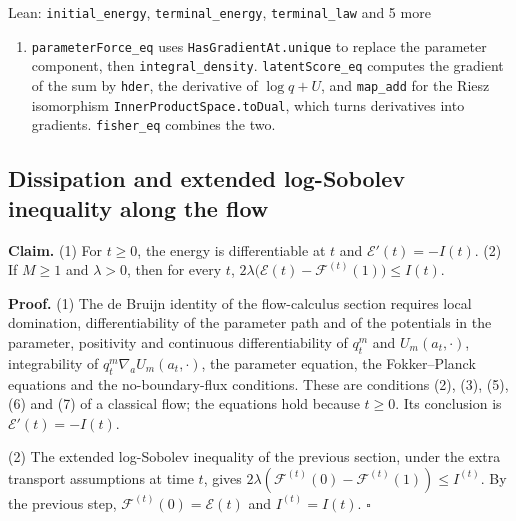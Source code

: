 \documentclass[11pt,a4paper]{report}
\begin{document}
\begin{leanbox}{Lean: \texttt{initial\_\allowbreak{}energy}, \texttt{terminal\_\allowbreak{}energy}, \texttt{terminal\_\allowbreak{}law} and 5 more}
\begin{enumerate}
\item \texttt{parameter\allowbreak{}Force\_\allowbreak{}eq} uses \texttt{Has\allowbreak{}Gradient\allowbreak{}At.\allowbreak{}unique} to replace the parameter component, then \texttt{integral\_\allowbreak{}density}. \texttt{latent\allowbreak{}Score\_\allowbreak{}eq} computes the gradient of the sum by \texttt{hder}, the derivative of \(\log q+U\), and \texttt{map\_\allowbreak{}add} for the Riesz isomorphism \texttt{Inner\allowbreak{}Product\allowbreak{}Space.\allowbreak{}to\allowbreak{}Dual}, which turns derivatives into gradients. \texttt{fisher\_\allowbreak{}eq} combines the two.

\end{enumerate}
\end{leanbox}
\subsection{\texorpdfstring{Dissipation and extended log-Sobolev inequality along the flow}{Dissipation and extended log-Sobolev inequality along the flow}}


\textbf{Claim.} (1) For \(t\ge0\), the energy is differentiable at \(t\) and \(\mathcal E'(t)=-I(t)\). (2) If \(M\ge1\) and \(\lambda>0\), then for every \(t\), \(2\lambda\bigl(\mathcal E(t)-\mathcal F^{(t)}(1)\bigr)\le I(t)\).




\textbf{Proof.} (1) The de Bruijn identity of the flow-calculus section requires local domination, differentiability of the parameter path and of the potentials in the parameter, positivity and continuous differentiability of \(q_t^m\) and \(U_m(a_t,\cdot)\), integrability of \(q_t^m\nabla_aU_m(a_t,\cdot)\), the parameter equation, the Fokker–Planck equations and the no-boundary-flux conditions. These are conditions (2), (3), (5), (6) and (7) of a classical flow; the equations hold because \(t\ge0\). Its conclusion is \(\mathcal E'(t)=-I(t)\).




(2) The extended log-Sobolev inequality of the previous section, under the extra transport assumptions at time \(t\), gives \(2\lambda(\mathcal F^{(t)}(0)-\mathcal F^{(t)}(1))\le I^{(t)}\). By the previous step, \(\mathcal F^{(t)}(0)=\mathcal E(t)\) and \(I^{(t)}=I(t)\). \(\square\)
\end{document}
